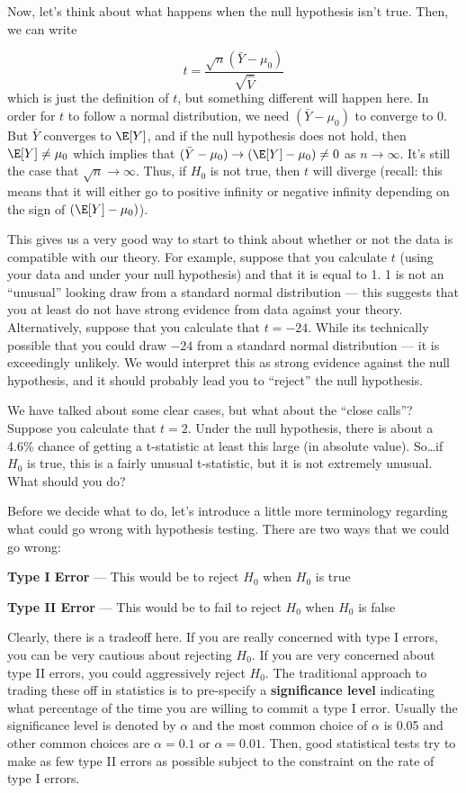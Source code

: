 \documentclass[
  letterpaper,
  DIV=11,
  numbers=noendperiod]{scrreprt}
\begin{document}
Now, let's think about what happens when the null hypothesis isn't true.
Then, we can write

\[
  t = \frac{\sqrt{n} (\bar{Y} - \mu_0)}{\sqrt{\hat{V}}}
\] which is just the definition of \(t\), but something different will
happen here. In order for \(t\) to follow a normal distribution, we need
\((\bar{Y} - \mu_0)\) to converge to 0. But \(\bar{Y}\) converges to
\(\E[Y]\), and if the null hypothesis does not hold, then
\(\E[Y] \neq \mu_0\) which implies that
\((\bar{Y} - \mu_0) \rightarrow (\E[Y] - \mu_0) \neq 0\) as
\(n \rightarrow \infty\). It's still the case that
\(\sqrt{n} \rightarrow \infty\). Thus, if \(H_0\) is not true, then
\(t\) will diverge (recall: this means that it will either go to
positive infinity or negative infinity depending on the sign of
\((\E[Y] - \mu_0)\)).

This gives us a very good way to start to think about whether or not the
data is compatible with our theory. For example, suppose that you
calculate \(t\) (using your data and under your null hypothesis) and
that it is equal to 1. 1 is not an ``unusual'' looking draw from a
standard normal distribution --- this suggests that you at least do not
have strong evidence from data against your theory. Alternatively,
suppose that you calculate that \(t=-24\). While its technically
possible that you could draw \(-24\) from a standard normal distribution
--- it is exceedingly unlikely. We would interpret this as strong
evidence against the null hypothesis, and it should probably lead you to
``reject'' the null hypothesis.

We have talked about some clear cases, but what about the ``close
calls''? Suppose you calculate that \(t=2\). Under the null hypothesis,
there is about a 4.6\% chance of getting a t-statistic at least this
large (in absolute value). So\ldots if \(H_0\) is true, this is a fairly
unusual t-statistic, but it is not extremely unusual. What should you
do?

Before we decide what to do, let's introduce a little more terminology
regarding what could go wrong with hypothesis testing. There are two
ways that we could go wrong:

\textbf{Type I Error} --- This would be to reject \(H_0\) when \(H_0\)
is true

\textbf{Type II Error} --- This would be to fail to reject \(H_0\) when
\(H_0\) is false

Clearly, there is a tradeoff here. If you are really concerned with type
I errors, you can be very cautious about rejecting \(H_0\). If you are
very concerned about type II errors, you could aggressively reject
\(H_0\). The traditional approach to trading these off in statistics is
to pre-specify a \textbf{significance level} indicating what percentage
of the time you are willing to commit a type I error. Usually the
significance level is denoted by \(\alpha\) and the most common choice
of \(\alpha\) is 0.05 and other common choices are \(\alpha=0.1\) or
\(\alpha=0.01\). Then, good statistical tests try to make as few type II
errors as possible subject to the constraint on the rate of type I
errors.
\end{document}
